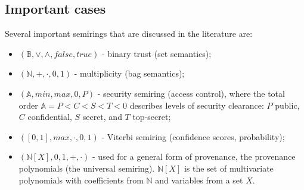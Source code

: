 \subsection{Important cases} Several important semirings that are discussed in the literature \cite{green2007provenance, Karvounarakis:2012:SDQ:2380776.2380778, Senellart2017} are:
\begin{itemize}
    \item $(\mathbb{B}, \vee, \wedge, false, true)$ - binary trust (set semantics);
    \item $(\mathbb{N}, +, \cdot, 0, 1)$ - multiplicity (bag semantics);
    \item $(\mathbb{A}, min, max, 0, P)$ - security semiring (access control), where the total order $\mathbb{A}=P<C<S<T<0$ describes levels of security clearance: $P$ public, $C$ confidential, $S$ secret, and $T$ top-secret;
    \item $([0,1], max, \cdot, 0, 1)$ - Viterbi semiring (confidence scores, probability);
    \item $(\mathbb{N}[X], 0, 1, +, \cdot)$ - used for a general form of provenance, the provenance polynomials (the universal semiring). $\mathbb{N}[X]$ is the set of multivariate polynomials with coefficients from $\mathbb{N}$ and variables from a set $X$.
\end{itemize}


